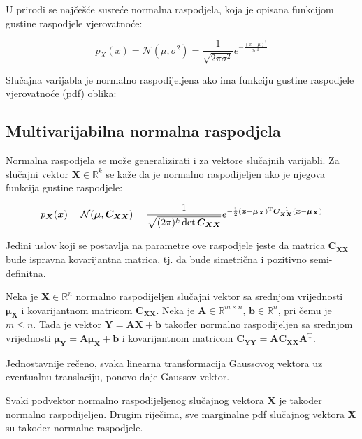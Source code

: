 
U prirodi se najčešće susreće normalna raspodjela, koja je opisana funkcijom
gustine raspodjele vjerovatnoće:

$$p_X(x) = \mathcal{N}(\mu,\sigma^2)
	= \frac{1}{\sqrt{2\pi\sigma^2}} e^{-\frac{(x-\mu)^2}{2\sigma^2}}$$

Slučajna varijabla je normalno raspodijeljena ako ima funkciju gustine
raspodjele vjerovatnoće (pdf) oblika:

\subsection{Multivarijabilna normalna raspodjela}

Normalna raspodjela se može generalizirati i za vektore slučajnih varijabli.
Za slučajni vektor $\bm X \in \mathbb{R}^k$ se kaže da je normalno
raspodijeljen ako je njegova funkcija gustine raspodjele:

$$p_{\bm X}(\bm x) = \mathcal{N}(\bm\mu,\bm C_{\bm X\bm X}) =
	\frac{1}{\sqrt{(2\pi)^k \det \bm C_{\bm X \bm X}}}
	e^{
		-\frac{1}{2}(\bm x - \bm\mu_{\bm X})^\text T
		\bm C_{\bm X \bm X}^{-1}
		(\bm x - \bm\mu_{\bm X})
 	 }$$

Jedini uslov koji se postavlja na parametre ove raspodjele jeste da matrica
$\bm C_{\bm X\bm X}$ bude ispravna kovarijantna matrica, tj. da bude simetrična
i pozitivno semi-definitna.

\begin{theorem}
	\label{th:lin-tr-gauss}
	Neka je $\bm X \in \mathbb{R}^n$ normalno raspodijeljen slučajni vektor sa
	srednjom vrijednosti $\bm\mu_{\bm X}$ i kovarijantnom matricom $\bm C_{\bm
	X\bm X}$. Neka je $\bm A \in \mathbb{R}^{m\times n}$, $\bm b \in
	\mathbb{R}^n$, pri čemu je $m\le n$. Tada je vektor $\bm Y = \bm A \bm X + \bm
	b$ također normalno raspodijeljen sa srednjom vrijednosti $\bm\mu_{\bm Y} =
	\bm A\bm\mu_{\bm X} + \bm b$ i kovarijantnom matricom $\bm C_{\bm Y\bm Y} =
	\bm A \bm C_{\bm X\bm X} \bm A^\mathrm T$.

\end{theorem}

Jednostavnije rečeno, svaka linearna transformacija Gaussovog vektora uz
eventualnu translaciju, ponovo daje Gaussov vektor.

\begin{corollary}
	Svaki podvektor normalno raspodijeljenog slučajnog vektora $\bm X$ je također
	normalno raspodijeljen. Drugim riječima, sve marginalne pdf slučajnog
	vektora $\bm X$ su također normalne raspodjele.
\end{corollary}

